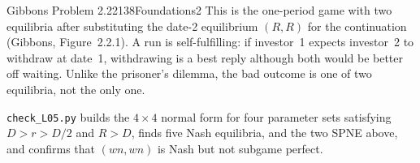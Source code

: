 \begin{exsol}{Gibbons Problem 2.22}{138}{Foundations}{2}
\interp This is the one-period game with two equilibria after substituting the date-2 equilibrium
$(R,R)$ for the continuation (Gibbons, Figure~2.2.1). A run is self-fulfilling: if investor~1 expects
investor~2 to withdraw at date~1, withdrawing is a best reply although both would be better off
waiting. Unlike the prisoner's dilemma, the bad outcome is one of two equilibria, not the only one.

\verify \texttt{check\_L05.py} builds the $4\times4$ normal form for four parameter sets satisfying
$D > r > D/2$ and $R > D$, finds five Nash equilibria, and the two SPNE above, and confirms that
$(wn,wn)$ is Nash but not subgame perfect.

\end{exsol}

